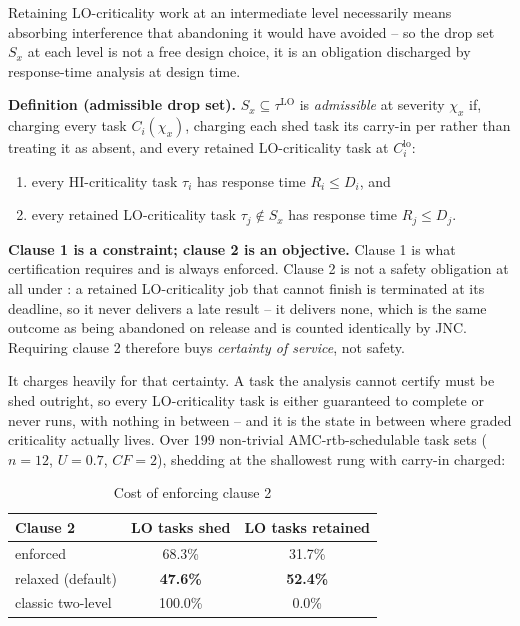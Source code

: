 Retaining LO-criticality work at an intermediate level necessarily means
absorbing interference that abandoning it would have avoided -- so the drop
set $S_x$ at each level is not a free design choice, it is an obligation
discharged by response-time analysis at design time.

\textbf{Definition (admissible drop set).} $S_x \subseteq \tau^{\mathrm{LO}}$
is \emph{admissible} at severity $\chi_x$ if, charging every task
$C_i(\chi_x)$, charging each shed task its carry-in per
 rather than treating it as absent, and every retained
LO-criticality task at $C_i^{\mathrm{lo}}$:
\begin{enumerate}
\item every HI-criticality task $\tau_i$ has response time $R_i \leq D_i$, and
\item every retained LO-criticality task $\tau_j \notin S_x$ has response time
  $R_j \leq D_j$.
\end{enumerate}

\textbf{Clause 1 is a constraint; clause 2 is an objective.} Clause 1 is what
certification requires and is always enforced. Clause 2 is not a safety
obligation at all under : a retained LO-criticality job
that cannot finish is terminated at its deadline, so it never delivers a late
result -- it delivers none, which is the same outcome as being abandoned on
release and is counted identically by JNC. Requiring clause 2 therefore buys
\emph{certainty of service}, not safety.

It charges heavily for that certainty. A task the analysis cannot certify must
be shed outright, so every LO-criticality task is either guaranteed to complete
or never runs, with nothing in between -- and it is the state in between where
graded criticality actually lives. Over 199 non-trivial AMC-rtb-schedulable
task sets ($n=12$, $U=0.7$, $CF=2$), shedding at the shallowest rung with
carry-in charged:

\begin{table}[h]
\centering
\caption{Cost of enforcing clause 2}
\label{tab:clause2}
\begin{tabular}{lcc}
\toprule
Clause 2 & LO tasks shed & LO tasks retained \\
\midrule
enforced          & 68.3\%  & 31.7\% \\
relaxed (default) & \textbf{47.6\%}  & \textbf{52.4\%} \\
\midrule
classic two-level & 100.0\% & 0.0\% \\
\bottomrule
\end{tabular}
\end{table}

